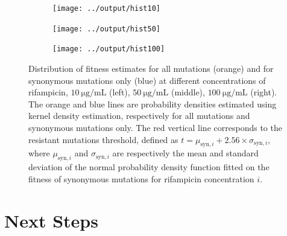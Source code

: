 \documentclass[12pt]{article}
\begin{document}
  \begin{figure}[ht]
    \begin{subfigure}{.33\textwidth}
      \centering
      \texttt{[image: ../output/hist10]}
    \end{subfigure}
    \begin{subfigure}{.33\textwidth}
      \centering
      \texttt{[image: ../output/hist50]}
    \end{subfigure}
    \begin{subfigure}{.33\textwidth}
      \centering
      \texttt{[image: ../output/hist100]}
    \end{subfigure}
    \caption{Distribution of fitness estimates for all mutations (orange) and
    for synonymous mutations only (blue) at different concentrations of
    rifampicin, $\SI{10}{\micro\gram\per\milli\liter}$ (left),
    $\SI{50}{\micro\gram\per\milli\liter}$ (middle),
    $\SI{100}{\micro\gram\per\milli\liter}$ (right). The orange and blue lines
    are probability densities estimated using kernel density estimation,
    respectively for all mutations and synonymous mutations only. The red
    vertical line corresponds to the resistant mutations threshold, defined as
    $t = \mu_{\text{syn}, i} + 2.56 \times \sigma_{\text{syn}, i}$, where
    $\mu_{\text{syn}, i}$ and $\sigma_{\text{syn}, i}$ are respectively the
    mean and standard deviation of the normal probability density function
    fitted on the fitness of synonymous mutations for rifampicin concentration
    $i$.}%
    \label{fig:fitnessdistrib}
  \end{figure}


  \section{Next Steps}



  \newpage

  
  
\end{document}
